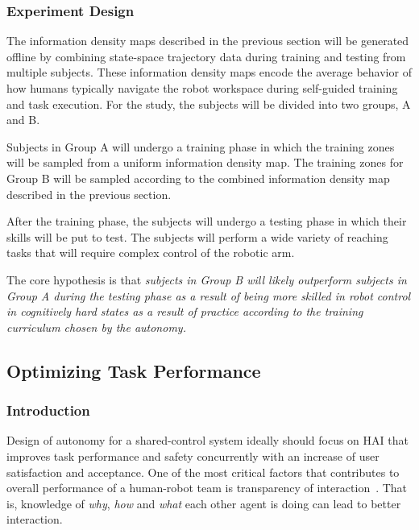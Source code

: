 \documentclass[12pt]{article}
\begin{document}
\subsubsection{Experiment Design}
The information density maps described in the previous section will be generated offline by combining state-space trajectory data during training and testing from multiple subjects. These information density maps encode the average behavior of how humans typically navigate the robot workspace during self-guided training and task execution. For the study, the subjects will be divided into two groups, A and B. 

Subjects in Group A will undergo a training phase in which the training zones will be sampled from a uniform information density map. The training zones for Group B will be sampled according to the combined information density map described in the previous section. 

After the training phase, the subjects will undergo a testing phase in which their skills will be put to test. The subjects will perform a wide variety of reaching tasks that will require complex control of the robotic arm. 

The core hypothesis is that \textit{subjects in Group B will likely outperform subjects in Group A during the testing phase as a result of being more skilled in robot control in cognitively hard states as a result of practice according to the training curriculum chosen by the autonomy.}

\subsection{Optimizing Task Performance}\label{study:rq3}

\subsubsection{Introduction}
Design of autonomy for a shared-control system ideally should focus on HAI that improves task performance and safety concurrently with an increase of user satisfaction and acceptance. One of the most critical factors that contributes to overall performance of a human-robot team is transparency of interaction~\cite{kiesler2005fostering}. That is, knowledge of \textit{why}, \textit{how} and \textit{what} each other agent is doing can lead to better interaction. 
\end{document}
